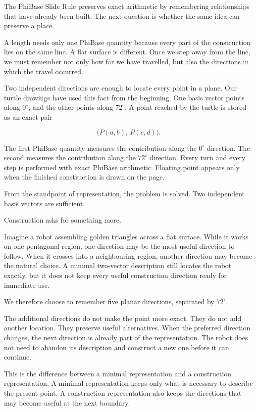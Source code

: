 \label{stone:flatearth}

The PhiBase Slide Rule preserves exact arithmetic by remembering relationships that have already been built. The next question is whether the same idea can preserve a place.

A length needs only one PhiBase quantity because every part of the construction lies on the same line. A flat surface is different. Once we step away from the line, we must remember not only how far we have travelled, but also the directions in which the travel occurred.

Two independent directions are enough to locate every point in a plane. Our turtle drawings have used this fact from the beginning. One basis vector points along \(0^\circ\), and the other points along \(72^\circ\). A point reached by the turtle is stored as an exact pair

\[
\bigl(P(a,b),\,P(c,d)\bigr).
\]

The first PhiBase quantity measures the contribution along the \(0^\circ\) direction. The second measures the contribution along the \(72^\circ\) direction. Every turn and every step is performed with exact PhiBase arithmetic. Floating point appears only when the finished construction is drawn on the page.

From the standpoint of representation, the problem is solved. Two independent basis vectors are sufficient.

Construction asks for something more.

Imagine a robot assembling golden triangles across a flat surface. While it works on one pentagonal region, one direction may be the most useful direction to follow. When it crosses into a neighbouring region, another direction may become the natural choice. A minimal two-vector description still locates the robot exactly, but it does not keep every useful construction direction ready for immediate use.

We therefore choose to remember five planar directions, separated by \(72^\circ\).

The additional directions do not make the point more exact. They do not add another location. They preserve useful alternatives. When the preferred direction changes, the next direction is already part of the representation. The robot does not need to abandon its description and construct a new one before it can continue.

This is the difference between a minimal representation and a construction representation. A minimal representation keeps only what is necessary to describe the present point. A construction representation also keeps the directions that may become useful at the next boundary.

